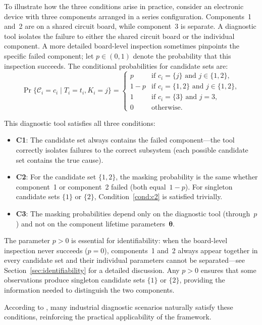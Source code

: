 \documentclass[11pt]{article}
\theoremstyle{definition}
\theoremstyle{plain}
\renewcommand{\v}[1]{\boldsymbol{#1}}
\newcommand{\btheta}{\v{\theta}}
\begin{document}
To illustrate how the three conditions arise in practice, consider an
electronic device with three components arranged in a series
configuration.
Components~1 and~2 are on a shared circuit board, while component~3 is
separate.
A diagnostic tool isolates the failure to either the shared circuit
board or the individual component.
A more detailed board-level inspection sometimes pinpoints the specific
failed component; let $p \in (0,1)$ denote the probability that this
inspection succeeds.
The conditional probabilities for candidate sets are:
\[
\Pr\{\mathcal{C}_i = c_i \mid T_i = t_i, K_i = j\}
= \begin{cases}
    p   & \text{if } c_i = \{j\} \text{ and } j \in \{1, 2\}, \\
    1-p & \text{if } c_i = \{1, 2\} \text{ and } j \in \{1, 2\}, \\
    1   & \text{if } c_i = \{3\} \text{ and } j = 3, \\
    0   & \text{otherwise.}
\end{cases}
\]

This diagnostic tool satisfies all three conditions:
\begin{itemize}
    \item \textbf{C1}: The candidate set always contains the failed
    component---the tool correctly isolates failures to the correct
    subsystem (each possible candidate set contains the true cause).
    \item \textbf{C2}: For the candidate set $\{1, 2\}$, the masking
    probability is the same whether component~1 or component~2 failed
    (both equal~$1-p$).
    For singleton candidate sets $\{1\}$ or $\{2\}$,
    Condition~\ref{cond:c2} is satisfied trivially.
    \item \textbf{C3}: The masking probabilities depend only on the
    diagnostic tool (through~$p$) and not on the component lifetime
    parameters~$\btheta$.
\end{itemize}

The parameter $p > 0$ is essential for identifiability: when the
board-level inspection never succeeds ($p = 0$), components~1 and~2
always appear together in every candidate set and their individual
parameters cannot be separated---see
Section~\ref{sec:identifiability} for a detailed discussion.
Any $p > 0$ ensures that some observations produce singleton candidate
sets $\{1\}$ or $\{2\}$, providing the information needed to
distinguish the two components.

According to \citet{guess1991}, many industrial diagnostic scenarios
naturally satisfy these conditions, reinforcing the practical
applicability of the framework.
\end{document}
